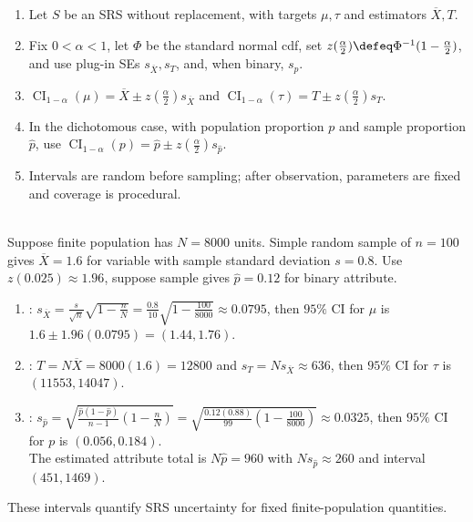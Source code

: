 \begin{method} \label{meth:srs-normal-confidence-intervals} 
\begin{enumerate}[label=(\roman*)]
\setlength{\itemsep}{0pt}
\item Let $S$ be an SRS without replacement, with targets $\mu,\tau$ and estimators $\overline{X},T$.
\item Fix $0<\alpha<1$, let $\Phi$ be the standard normal cdf, set $z(\frac{\alpha}{2})\defeq\Phi^{-1}(1-\frac{\alpha}{2})$, and use plug-in SEs $s_{\overline{X}},s_T$, and, when binary, $s_{\widehat p}$.
\item $\operatorname{CI}_{1-\alpha}(\mu)=\overline{X}\pm z(\frac{\alpha}{2})s_{\overline{X}}$ and $\operatorname{CI}_{1-\alpha}(\tau)=T\pm z(\frac{\alpha}{2})s_T$.
\item In the dichotomous case, with population proportion $p$ and sample proportion $\widehat p$, use $\operatorname{CI}_{1-\alpha}(p)=\widehat p\pm z(\frac{\alpha}{2})s_{\widehat p}$.
\item Intervals are random before sampling; after observation, parameters are fixed and coverage is procedural.
\end{enumerate}
\end{method}

\begin{example} \label{ex:srs-generic-confidence-intervals} \\
Suppose finite population has $N=8000$ units. Simple random sample of $n=100$ gives $\overline{X}=1.6$ for variable with sample standard deviation $s=0.8$. Use $z(0.025)\approx1.96$, suppose sample gives $\widehat p=0.12$ for binary attribute.
\begin{enumerate}[label=(\roman*)]
\setlength{\itemsep}{0pt}
\item {}: $s_{\overline{X}}=\frac{s}{\sqrt n}\sqrt{1-\frac{n}{N}}=\frac{0.8}{10}\sqrt{1-\frac{100}{8000}}\approx0.0795$, then $95\%$ CI for $\mu$ is $1.6\pm1.96(0.0795)=(1.44,1.76)$.
\item {}: $T=N\overline{X}=8000(1.6)=12800$ and $s_T=Ns_{\overline{X}}\approx636$, then $95\%$ CI for $\tau$ is $(11553,14047)$.
\item {}: $s_{\widehat p}=\sqrt{\frac{\widehat p(1-\widehat p)}{n-1}\left(1-\frac{n}{N}\right)}=\sqrt{\frac{0.12(0.88)}{99}\left(1-\frac{100}{8000}\right)}\approx0.0325$, then $95\%$ CI for $p$ is $(0.056,0.184)$.\\
The estimated attribute total is $N\widehat p=960$ with $Ns_{\widehat p}\approx260$ and interval $(451,1469)$.
\end{enumerate}
These intervals quantify SRS uncertainty for fixed finite-population quantities.
\end{example}

